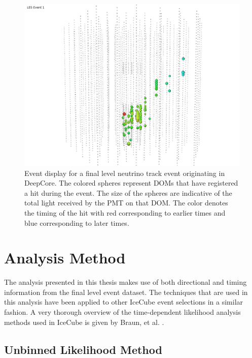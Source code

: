 \documentclass{gatech-thesis}
\begin{document}
\begin{figure}[ht]
  \begin{center}
    \includegraphics[width=1.0\textwidth,keepaspectratio]{LESEventForThesis.png}
  \end{center}
  \caption{Event display for a final level neutrino track event originating in DeepCore. The colored spheres represent DOMs that have registered a hit during the event. The size of the spheres are indicative of the total light received by the PMT on that DOM. The color denotes the timing of the hit with red corresponding to earlier times and blue corresponding to later times.}
  \label{fig:LESEventFinal}
\end{figure}


\chapter{Analysis Method}
The analysis presented in this thesis makes use of both directional and timing information from the final level event dataset. The techniques that are used in this analysis have been applied to other IceCube event selections in a similar fashion. A very thorough overview of the time-dependent likelihood analysis methods used in IceCube is given by Braun, et al. \cite{2010APh....33..175B}.

\section{Unbinned Likelihood Method}
\end{document}
